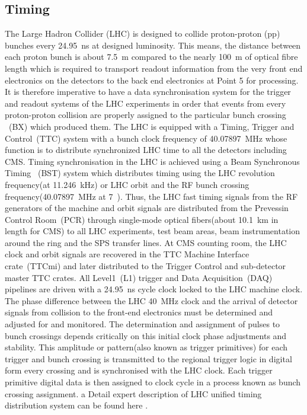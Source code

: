 \subsection{Timing}
The Large Hadron Collider (LHC) is designed to collide proton-proton (pp) bunches every  24.95~ns at designed luminosity. This means, the distance between each proton bunch is about 7.5~m compared to the nearly 100~m of optical fibre length which is required to transport readout information from the very front end electronics on the detectors to the back end  electronics at Point 5 for processing.
It is therefore imperative to have a data synchronisation system for the trigger and readout systems of the LHC experiments in order that events from every proton-proton collision are properly assigned to the particular bunch crossing ~(BX) which produced them.
The LHC is equipped with a Timing, Trigger and Control~(TTC) system with a bunch clock frequency of 40.07897~MHz whose function is to distribute synchronized LHC time to all the detectors including CMS.
Timing synchronisation in the LHC is achieved using a Beam Synchronous Timing ~(BST) system which distributes timing using the LHC revolution frequency(at 11.246~kHz) or LHC orbit  and the RF bunch crossing frequency(40.07897~MHz at 7~\TeV). 
Thus, the LHC fast timing signals from the RF generators  of the machine and orbit signals are distributed from the Prevessin Control Room~(PCR) through single-mode optical fibers(about 10.1~km in length for CMS) to all LHC experiments,  test beam areas, beam instrumentation around the ring and the SPS transfer lines.  At CMS counting room, the LHC clock and orbit signals  are recovered in the TTC Machine Interface crate~(TTCmi) and later distributed to the Trigger Control and sub-detector master TTC crates. All Level1~(L1) trigger and Data Acquisition~(DAQ) pipelines are driven with a 24.95~ns cycle clock locked to the LHC machine clock. The phase difference between the LHC 40~MHz clock and the arrival of detector signals from collision to the front-end electronics must be determined and adjusted for and monitored. The determination and assignment of pulses to bunch crossings depends critically on this initial clock phase adjustments and stability. This amplitude or pattern(also known as trigger primitives) for each trigger and bunch crossing is transmitted to the regional trigger logic in digital form every crossing and is synchronised with the LHC clock. Each trigger primitive digital data is then assigned to clock cycle in a process known as bunch crossing assignment. a   Detail expert description of LHC unified timing distribution system can be found here \cite{LHCT, LHCT1, LHCT2, LHCT3}.

